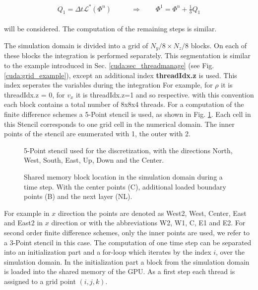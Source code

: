 \begin{align}
    \begin{split}
    Q_1 = \Delta t \mathcal{L}^*\left(\Phi^n\right)\qquad &\Rightarrow \qquad \Phi^{1} = \Phi^n + \frac{1}{3}Q_1
    \end{split}
\end{align}

will be considered.  The computation of the remaining steps is similar.


The simulation domain is divided into a grid of  $N_y/8 \times N_z/8$ blocks. On each of these blocks the integration is performed separately.
This segmentation is similar to the example introduced in Sec. \ref{cuda:sec_threadmanage} (see Fig. \ref{cuda:grid_example}), except an
additional index \textbf{threadIdx.z} is used.
This index seperates the variables during the integration
For example, for $\rho$ it is threadIdx.z = 0, for $v_x$  it is threadIdx.z=1 and so respective.
with this convention each block contains a total number of 8x8x4 threads.
For a computation of the finite difference schemes  a 5-Point stencil is used, as shown in Fig. \ref{cuda:stencil}.
Each cell in this Stencil corresponds to one grid cell in the numerical domain.
The inner points of the stencil are enumerated with 1, the outer with 2.


\begin{figure}[!bp]
      \centering
        \caption{
            5-Point stencil used for the discretization, with the directions North, West, South, East, Up, Down and the Center.
        }
       \label{cuda:stencil}
\end{figure}

\begin{figure}[!bp]
      \centering
       \caption{
           Shared memory block location in the simulation domain during a time step. With the center points (C), additional loaded boundary  points (B)
           and the next layer (NL).
       }
       \label{cuda:timestep_algo_img}
\end{figure}
\clearpage

For example in $x$ direction the points are denoted as West2,
West, Center, East and East2 in $x$ direction or with the abbreviations W2, W1, C, E1 and E2.
For second order finite difference schemes, only the inner points  are used, we refer to a 3-Point stencil in this case.
The computation of one time step can be separated into an initialization part and a for-loop which iterates by the index $i$, over the simulation domain.
In the initialization part a block from the simulation domain is loaded into the shared memory of the GPU.
As a first step each thread is assigned to a grid point $(i, j, k)$.

